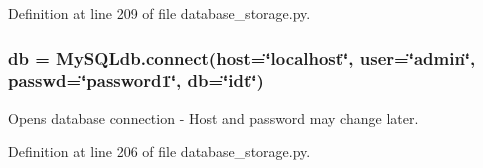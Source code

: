 Definition at line 209 of file database\+\_\+storage.\+py.

\subsubsection[{\texorpdfstring{db}{db}}]{\setlength{\rightskip}{0pt plus 5cm}db = My\+S\+Q\+Ldb.\+connect(host=\char`\"{}localhost\char`\"{}, user=\char`\"{}admin\char`\"{}, passwd=\char`\"{}password1\char`\"{}, db=\char`\"{}idt\char`\"{})}\hypertarget{namespacesrc_1_1database__storage_a89a7f6028a19c3dc081cc5f16eb53891}{}\label{namespacesrc_1_1database__storage_a89a7f6028a19c3dc081cc5f16eb53891}


Opens database connection -\/ Host and password may change later. 



Definition at line 206 of file database\+\_\+storage.\+py.

